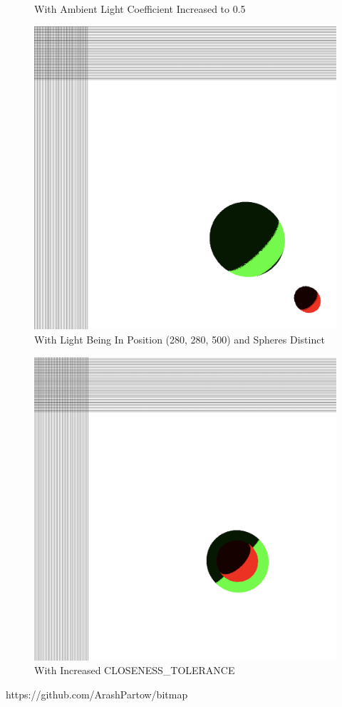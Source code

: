 \documentclass{article}
\begin{document}
\begin{centering}
\begin{figure}[H]
\caption{With Ambient Light Coefficient Increased to 0.5}
\label{fig:figure2}
\end{figure}
\begin{figure}[H]
\includegraphics[width=1\textwidth]{./images/CloserLight.png}
\caption{With Light Being In Position (280, 280, 500) and Spheres Distinct}
\label{fig:figure2}
\end{figure}
\begin{figure}[H]
\includegraphics[width=1\textwidth]{./images/IncreasedTolerance.png}
\caption{With Increased CLOSENESS\_TOLERANCE}
\label{fig:figure2}
\end{figure}
\end{centering}

\begin{thebibliography}{9}
  https://github.com/ArashPartow/bitmap
\end{thebibliography}
\end{document}
